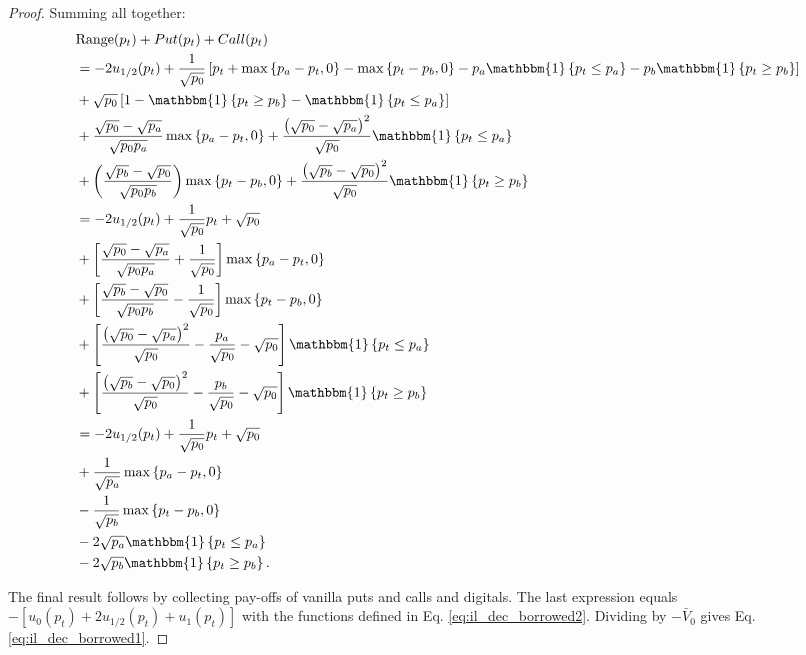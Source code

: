 \documentclass[pdftex,11pt,a4paper] {article}
\begin{document}
\begin{proof}
Summing all together:
\begin{equation} \label{eq:rp10}
\begin{split}
& \mathrm{Range}(p_{t}) + Put(p_{t}) + Call(p_{t}) \\
& =  -  2u_{1/2}(p_{t}) + \frac{1}{\sqrt{p_{0}}} \left[p_{t} + \max\left\{ p_{a}-p_{t}, 0\right\} - \max\left\{ p_{t}-p_{b}, 0\right\} - p_{a}\mathbbm{1}\left\{p_{t}\leq p_{a}\right\} - p_{b}\mathbbm{1}\left\{p_{t} \geq p_{b}\right\}\right] \\
& + \sqrt{p_{0}}\left[1 - \mathbbm{1}\left\{p_{t} \geq p_{b}\right\} - \mathbbm{1}\left\{p_{t}\leq p_{a}\right\} \right]\\
& + \frac{\sqrt{p_{0}}-\sqrt{p_{a}}}{\sqrt{p_{0}p_{a}}} \max\left\{ p_{a}-p_{t}, 0\right\}  + \frac{\left(\sqrt{p_{0}}-\sqrt{p_{a}}\right)^{2}}{\sqrt{p_{0}}} \mathbbm{1}\left\{p_{t}\leq p_{a}\right\}\\
& + \left(\frac{\sqrt{p_{b}}-\sqrt{p_{0}}}{\sqrt{p_{0}p_{b}}} \right)  \max\left\{ p_{t}-p_{b}, 0 \right\} + \frac{\left(\sqrt{p_{b}}-\sqrt{p_{0}}\right)^{2}}{\sqrt{p_{0}}} \mathbbm{1}\left\{p_{t} \geq p_{b}\right\}\\
& =  -  2u_{1/2}(p_{t}) + \frac{1}{\sqrt{p_{0}}} p_{t}   + \sqrt{p_{0}} \\
& + \left[ \frac{\sqrt{p_{0}}-\sqrt{p_{a}}}{\sqrt{p_{0}p_{a}}} +\frac{1}{\sqrt{p_{0}}}  \right]\max\left\{ p_{a}-p_{t}, 0\right\} \\
& + \left[\frac{\sqrt{p_{b}}-\sqrt{p_{0}}}{\sqrt{p_{0}p_{b}}}-\frac{1}{\sqrt{p_{0}}}  \right]\max\left\{ p_{t}-p_{b}, 0 \right\} \\
& +  \left[ \frac{\left(\sqrt{p_{0}}-\sqrt{p_{a}}\right)^{2}}{\sqrt{p_{0}}} - \frac{p_{a}}{\sqrt{p_{0}}} -\sqrt{p_{0}}\right] \mathbbm{1}\left\{p_{t}\leq p_{a}\right\}\\
& + \left[\frac{\left(\sqrt{p_{b}}-\sqrt{p_{0}}\right)^{2}}{\sqrt{p_{0}}} -\frac{p_{b}}{\sqrt{p_{0}}} -\sqrt{p_{0}}\right] \mathbbm{1}\left\{p_{t} \geq p_{b}\right\}\\
&  =  -  2u_{1/2}(p_{t}) + \frac{1}{\sqrt{p_{0}}} p_{t}   + \sqrt{p_{0}} \\
& + \frac{1}{\sqrt{p_{a}}}\max\left\{ p_{a}-p_{t}, 0\right\} \\
& -\frac{1}{\sqrt{p_{b}}}  \max\left\{ p_{t}-p_{b}, 0 \right\} \\
& -2\sqrt{p_{a}} \mathbbm{1}\left\{p_{t}\leq p_{a}\right\}\\
& -2\sqrt{p_{b}}\mathbbm{1}\left\{p_{t} \geq p_{b}\right\}.
\end{split}
\end{equation}


The final result follows by collecting pay-offs of vanilla puts and calls and digitals. The last expression equals $-\left[u_{0}(p_{t}) + 2u_{1/2}(p_{t}) + u_{1}(p_{t})\right]$ with the functions defined in Eq. \eqref{eq:il_dec_borrowed2}. Dividing by $-\bar{V}_{0}$ gives Eq. \eqref{eq:il_dec_borrowed1}.

\end{proof}
\end{document}
